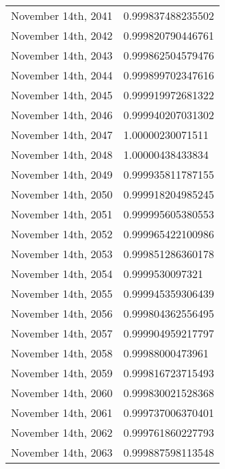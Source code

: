 \documentclass{amsart}
\theoremstyle{plain}
\numberwithin{equation}{section}
\begin{document}
\begin{table}[ht]
\begin{tabular}{l | l}
  November 14th, 2041 & 0.999837488235502 \\
  November 14th, 2042 & 0.999820790446761 \\
  November 14th, 2043 & 0.999862504579476 \\
  November 14th, 2044 & 0.999899702347616 \\
  November 14th, 2045 & 0.999919972681322 \\
  November 14th, 2046 & 0.999940207031302 \\
  November 14th, 2047 & 1.00000230071511 \\
  November 14th, 2048 & 1.00000438433834 \\
  November 14th, 2049 & 0.999935811787155 \\
  November 14th, 2050 & 0.999918204985245 \\
  November 14th, 2051 & 0.999995605380553 \\
  November 14th, 2052 & 0.999965422100986 \\
  November 14th, 2053 & 0.999851286360178 \\
  November 14th, 2054 & 0.9999530097321 \\
  November 14th, 2055 & 0.999945359306439 \\
  November 14th, 2056 & 0.999804362556495 \\
  November 14th, 2057 & 0.999904959217797 \\
  November 14th, 2058 & 0.99988000473961 \\
  November 14th, 2059 & 0.999816723715493 \\
  November 14th, 2060 & 0.999830021528368 \\
  November 14th, 2061 & 0.999737006370401 \\
  November 14th, 2062 & 0.999761860227793 \\
  November 14th, 2063 & 0.999887598113548 \\
\end{tabular}
\label{adjfactors}
\end{table}

\end{document}
